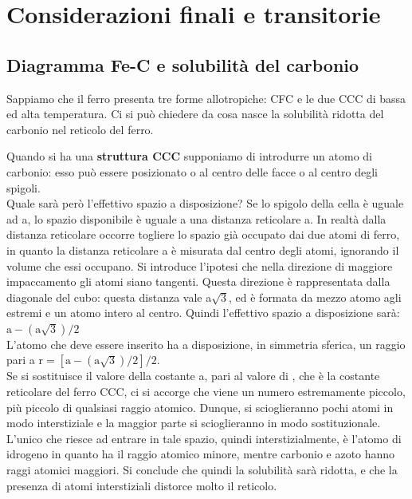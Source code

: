 \setchapterpreamble[u]{\margintoc}
\chapter{Considerazioni finali e transitorie}

\section{Diagramma Fe-C e solubilità del carbonio}

Sappiamo che il ferro presenta tre forme allotropiche: CFC e le due CCC di bassa ed alta temperatura. Ci si può chiedere da cosa nasce la solubilità ridotta del carbonio nel reticolo del ferro.

Quando si ha una \textbf{struttura CCC} supponiamo di introdurre un atomo di carbonio: esso può essere posizionato o al centro delle facce o al centro degli spigoli.\\
Quale sarà però l’effettivo spazio a disposizione?
Se lo spigolo della cella è uguale ad a, lo spazio disponibile è uguale a una distanza reticolare a. In realtà dalla distanza reticolare occorre togliere lo spazio già occupato dai due atomi di ferro, in quanto la distanza reticolare a è misurata dal centro degli atomi, ignorando il volume che essi occupano. Si introduce l’ipotesi che nella direzione di maggiore impaccamento gli atomi siano tangenti. Questa direzione è rappresentata dalla diagonale del cubo: questa distanza vale a$\sqrt{3}$, ed è formata da mezzo atomo agli estremi e un atomo intero al centro. Quindi l’effettivo spazio a disposizione sarà: $\mathrm{a-(a\sqrt{3})/2}$\\
L’atomo che deve essere inserito ha a disposizione, in simmetria sferica, un raggio pari a $\mathrm{r = [a-(a\sqrt{3})/2]/2}$.\\
Se si sostituisce il valore della costante a, pari al valore di , che è la costante reticolare del ferro CCC, ci si accorge che viene un numero estremamente piccolo, più piccolo di qualsiasi raggio atomico. Dunque, si scioglieranno pochi atomi in modo interstiziale e la maggior parte si scioglieranno in modo sostituzionale. L’unico che riesce ad entrare in tale spazio, quindi interstizialmente, è l’atomo di idrogeno in quanto ha il raggio atomico minore, mentre carbonio e azoto hanno raggi atomici maggiori. Si conclude che quindi la solubilità sarà ridotta, e che la presenza di atomi interstiziali distorce molto il reticolo.

